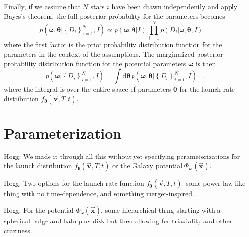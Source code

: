 \documentclass[12pt]{article}
\newcommand{\tvector}[1]{\boldsymbol{\vec{#1}}}
\newcommand{\vx}{\tvector{x}}
\newcommand{\vv}{\tvector{v}}
\newcommand{\pvector}[1]{\boldsymbol{#1}}
\newcommand{\vtheta}{\pvector{\theta}}
\newcommand{\vomega}{\pvector{\omega}}
\newcommand{\dd}{\mathrm{d}}
\newcommand{\flaunch}{f_{\vtheta}}
\newcommand{\potential}{\Phi_{\vomega}}
\newcommand{\allN}[1]{\left\{{#1}\right\}_{i=1}^N}
\newcommand{\allD}{\allN{D_i}}
\begin{document}
Finally, if we assume that $N$ stars $i$ have been drawn independently
and apply Bayes's theorem, the full posterior probability for the
parameters becomes
\begin{equation}
p\left(\vomega,\vtheta|\allD,I\right)\propto
 p(\vomega,\vtheta|I)\,\prod_{i=1}^N p(D_i|\vomega,\vtheta,I) \quad,
\end{equation}
where the first factor is the prior probability distribution function
for the parameters in the context of the assumptions.  The
marginalized posterior probability distribution function for the
potential parameters $\vomega$ is then
\begin{equation}
p\left(\vomega|\allD,I\right)=\int\dd\vtheta
 \,p\left(\vomega,\vtheta|\allD,I\right) \quad,
\end{equation}
where the integral is over the entire space of parameters $\vtheta$
for the launch rate distribution $\flaunch(\vv,T,t)$.

\section{Parameterization}

Hogg: We made it through all this without yet specifying
parameterizations for the launch distribution $\flaunch(\vv,T,t)$ or
the Galaxy potential $\potential(\vx)$.

Hogg: Two options for the launch rate function $\flaunch(\vv,T,t)$:
some power-law-like thing with no time-dependence, and something
merger-inspired.

Hogg: For the potential $\potential(\vx)$, some hierarchical thing
starting with a spherical bulge and halo plus disk but then allowing
for triaxiality and other craziness.
\end{document}
